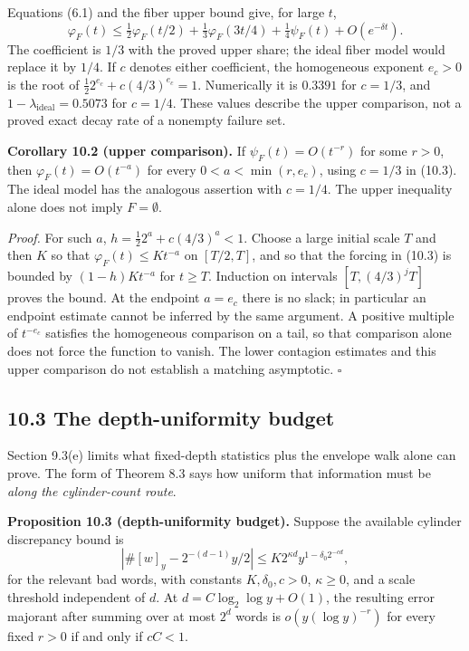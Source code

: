\documentclass[11pt,a4paper]{article}
\begin{document}
Equations (6.1) and the fiber upper bound give, for large \(t\), \[
\varphi_F(t)\le\tfrac12\varphi_F(t/2)
 +\tfrac13\varphi_F(3t/4)+\tfrac14\psi_F(t)+O(e^{-\delta t}).
\tag{10.3}
\] The coefficient is \(1/3\) with the proved upper share; the ideal
fiber model would replace it by \(1/4\). If \(c\) denotes either
coefficient, the homogeneous exponent \(e_c>0\) is the root of
\(\tfrac12 2^{e_c}+c(4/3)^{e_c}=1\). Numerically it is \(0.3391\) for
\(c=1/3\), and \(1-\lambda_{\mathrm{ideal}}=0.5073\) for \(c=1/4\).
These values describe the upper comparison, not a proved exact decay
rate of a nonempty failure set.

\textbf{Corollary 10.2 (upper comparison).} If \(\psi_F(t)=O(t^{-r})\)
for some \(r>0\), then \(\varphi_F(t)=O(t^{-a})\) for every
\(0<a<\min(r,e_c)\), using \(c=1/3\) in (10.3). The ideal model has the
analogous assertion with \(c=1/4\). The upper inequality alone does not
imply \(F=\emptyset\).

\emph{Proof.} For such \(a\), \(h=\tfrac12 2^a+c(4/3)^a<1\). Choose a
large initial scale \(T\) and then \(K\) so that
\(\varphi_F(t)\le Kt^{-a}\) on \([T/2,T]\), and so that the forcing in
(10.3) is bounded by \((1-h)Kt^{-a}\) for \(t\ge T\). Induction on
intervals \([T,(4/3)^jT]\) proves the bound. At the endpoint \(a=e_c\)
there is no slack; in particular an endpoint estimate cannot be inferred
by the same argument. A positive multiple of \(t^{-e_c}\) satisfies the
homogeneous comparison on a tail, so that comparison alone does not
force the function to vanish. The lower contagion estimates and this
upper comparison do not establish a matching asymptotic. \(\square\)

\subsection{10.3 The depth-uniformity
budget}\label{the-depth-uniformity-budget}

Section 9.3(e) limits what fixed-depth statistics plus the envelope walk
alone can prove. The form of Theorem 8.3 says how uniform that
information must be \emph{along the cylinder-count route}.

\textbf{Proposition 10.3 (depth-uniformity budget).} Suppose the
available cylinder discrepancy bound is \[
\left|\#[w]_y-2^{-(d-1)}y/2\right|
 \le K2^{\kappa d}y^{1-\delta_0 2^{-cd}},
\] for the relevant bad words, with constants \(K,\delta_0,c>0\),
\(\kappa\ge0\), and a scale threshold independent of \(d\). At
\(d=C\log_2\log y+O(1)\), the resulting error majorant after summing
over at most \(2^d\) words is \(o(y(\log y)^{-r})\) for every fixed
\(r>0\) if and only if \(cC<1\).
\end{document}
